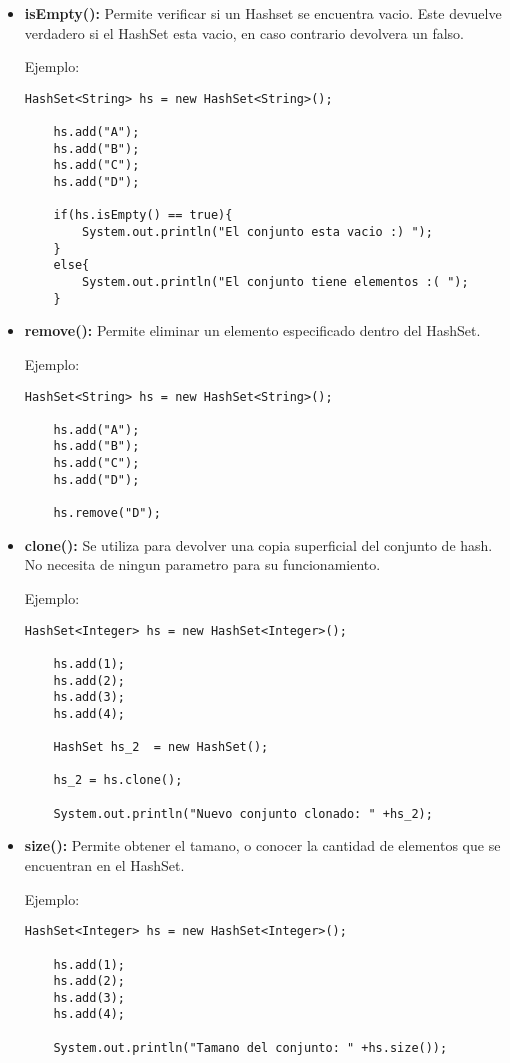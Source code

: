 \documentclass[12pt, letterpaper]{article} %
\begin{document}
\begin{itemize}
    \item \textbf{isEmpty():} Permite verificar si un Hashset se encuentra vacio. Este devuelve verdadero si el HashSet esta vacio, en caso contrario devolvera un falso.

    Ejemplo:
    \lstset{language = Java, breaklines=true, basicstyle=\footnotesize}
    \begin{lstlisting}[frame=single]
    HashSet<String> hs = new HashSet<String>();

    hs.add("A");
    hs.add("B");
    hs.add("C");
    hs.add("D");

    if(hs.isEmpty() == true){
        System.out.println("El conjunto esta vacio :) ");
    }
    else{
    	System.out.println("El conjunto tiene elementos :( ");
    }
    \end{lstlisting}

    \item \textbf{remove():} Permite eliminar un elemento especificado dentro del HashSet.

    Ejemplo:
    \lstset{language = Java, breaklines=true, basicstyle=\footnotesize}
    \begin{lstlisting}[frame=single]
    HashSet<String> hs = new HashSet<String>();

    hs.add("A");
    hs.add("B");
    hs.add("C");
    hs.add("D");

    hs.remove("D");
    \end{lstlisting}

    \item \textbf{clone():} Se utiliza para devolver una copia superficial del conjunto de hash. No necesita de ningun parametro para su funcionamiento.

    Ejemplo:
    \lstset{language = Java, breaklines=true, basicstyle=\footnotesize}
    \begin{lstlisting}[frame=single]
    HashSet<Integer> hs = new HashSet<Integer>();

    hs.add(1);
    hs.add(2);
    hs.add(3);
    hs.add(4);

    HashSet hs_2  = new HashSet();

    hs_2 = hs.clone();

    System.out.println("Nuevo conjunto clonado: " +hs_2);
    \end{lstlisting}

    \item \textbf{size():} Permite obtener el tamano, o conocer la cantidad de elementos que se encuentran en el HashSet.

    Ejemplo:
    \lstset{language = Java, breaklines=true, basicstyle=\footnotesize}
    \begin{lstlisting}[frame=single]
    HashSet<Integer> hs = new HashSet<Integer>();

    hs.add(1);
    hs.add(2);
    hs.add(3);
    hs.add(4);

    System.out.println("Tamano del conjunto: " +hs.size());
    \end{lstlisting}
\end{itemize}
\end{document}
